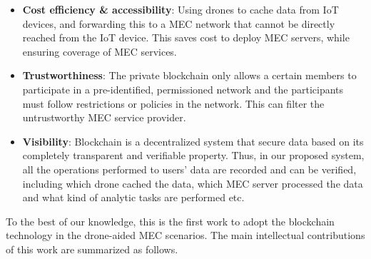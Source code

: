 \begin{itemize}
\item \textbf{Cost efficiency \& accessibility}:
Using drones to cache data from IoT devices, and forwarding this to a MEC network that cannot be directly reached from the IoT device. This saves cost to deploy MEC servers, while ensuring coverage of MEC services.  
\item \textbf{Trustworthiness}:
The private blockchain only allows a certain members to participate in a pre-identified, permissioned network and the participants must follow restrictions or policies in the network. This can filter the untrustworthy MEC service provider.
\item \textbf{Visibility}: Blockchain is a decentralized system that secure data based on its completely transparent and verifiable property. Thus, in our proposed system, all the operations performed to users' data are recorded and can be verified, including which drone cached the data, which MEC server processed the data and what kind of analytic tasks are performed etc. 
 
\end{itemize}

To the best of our knowledge, this is the first work to adopt the blockchain technology in the drone-aided MEC scenarios.
The main intellectual contributions of this work are summarized as follows.

